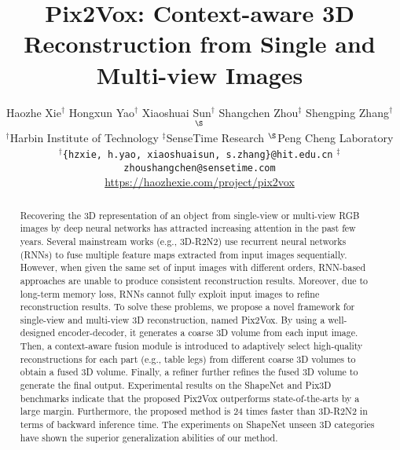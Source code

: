 \documentclass[10pt,twocolumn,letterpaper]{article}
\begin{document}
\title{Pix2Vox: Context-aware 3D Reconstruction from Single and Multi-view Images}

\author{Haozhe Xie$^\dag$\hspace{0.05in}
Hongxun Yao$^\dag$\hspace{0.05in}
Xiaoshuai Sun$^\dag$\hspace{0.05in}
Shangchen Zhou$^\ddag$\hspace{0.05in}
Shengping Zhang$^\dag$$^\S$\\
$^\dag$Harbin Institute of Technology\hspace{0.1in}
$^\ddag$SenseTime Research 
$^\S$Peng Cheng Laboratory \\
$^\dag${\tt\small\{hzxie, h.yao, xiaoshuaisun, s.zhang\}@hit.edu.cn} 
$^\ddag${\tt\small zhoushangchen@sensetime.com} \\
{\small\url{https://haozhexie.com/project/pix2vox}}
}

\maketitle


\begin{abstract}
Recovering the 3D representation of an object from single-view or multi-view RGB images by deep neural networks has attracted increasing attention in the past few years.
Several mainstream works (e.g., 3D-R2N2) use recurrent neural networks (RNNs) to fuse multiple feature maps extracted from input images sequentially.
However, when given the same set of input images with different orders, RNN-based approaches are unable to produce consistent reconstruction results.
Moreover, due to long-term memory loss, RNNs cannot fully exploit input images to refine reconstruction results.
To solve these problems, we propose a novel framework for single-view and multi-view 3D reconstruction, named Pix2Vox.
By using a well-designed encoder-decoder, it generates a coarse 3D volume from each input image.
Then, a context-aware fusion module is introduced to adaptively select high-quality reconstructions for each part (e.g., table legs) from different coarse 3D volumes to obtain a fused 3D volume.
Finally, a refiner further refines the fused 3D volume to generate the final output.
Experimental results on the ShapeNet and Pix3D benchmarks indicate that the proposed Pix2Vox outperforms state-of-the-arts by a large margin.
Furthermore, the proposed method is 24 times faster than 3D-R2N2 in terms of backward inference time.
The experiments on ShapeNet unseen 3D categories have shown the superior generalization abilities of our method.
\end{abstract}
\end{document}

